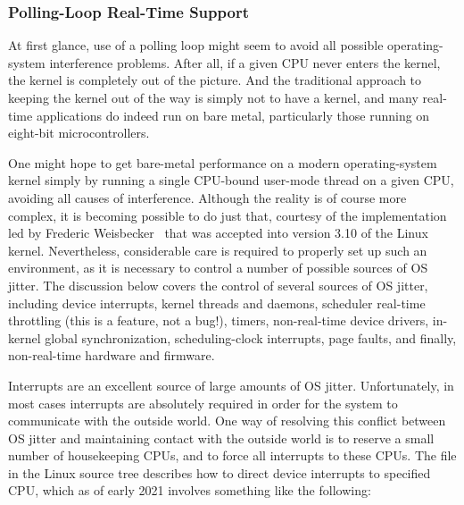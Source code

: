 \subsubsection{Polling-Loop Real-Time Support}
\label{sec:advsync:Polling-Loop Real-Time Support}

At first glance, use of a polling loop might seem to avoid all possible
operating-system interference problems.
After all, if a given CPU never enters the kernel, the kernel is
completely out of the picture.
And the traditional approach to keeping the kernel out of the way is
simply not to have a kernel, and many real-time applications do
indeed run on bare metal, particularly those running on eight-bit
microcontrollers.

One might hope to get bare-metal performance on a modern operating-system
kernel simply by running a single CPU-bound user-mode thread on a
given CPU, avoiding all causes of interference.
Although the reality is of course more complex, it is becoming
possible to do just that,
courtesy of the  implementation led by
Frederic Weisbecker~\cite{JonCorbet2013NO-HZ-FULL,FredericWeisbecker2013nohz}
that was accepted into version 3.10 of the Linux kernel.
Nevertheless, considerable care is required to properly set up such
an environment, as it is necessary to control a number of possible
sources of OS jitter.
The discussion below covers the control of several sources of OS
jitter, including device interrupts, kernel threads and daemons,
scheduler real-time throttling (this is a feature, not a bug!),
timers, non-real-time device drivers, in-kernel global synchronization,
scheduling-clock interrupts, page faults, and finally, non-real-time
hardware and firmware.

Interrupts are an excellent source of large amounts of OS jitter.
Unfortunately, in most cases interrupts are absolutely required in order
for the system to communicate with the outside world.
One way of resolving this conflict between OS jitter and maintaining
contact with the outside world is to reserve a small number of
housekeeping CPUs, and to force all interrupts to these CPUs.
The  file in the Linux source tree
describes how to direct device interrupts to specified CPU,
which as of early 2021 involves something like the following:

